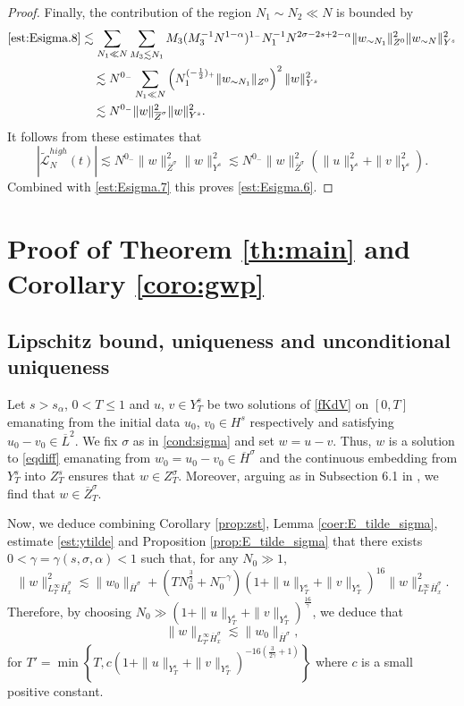 \documentclass{amsart}
\theoremstyle{definition}
\theoremstyle{remark}
\numberwithin{equation}{section}
\begin{document}
\begin{proof}
Finally, the contribution of the region $N_1\sim N_2\ll N$ is bounded by 
\begin{align*}
 \eqref{est:Esigma.8}  & \lesssim  \sum_{N_1\ll N} \sum_{M_3\lesssim N_1} M_3 (M_3^{-1}N^{1-\alpha})^{1_-} N_1^{-1} N^{2\sigma-2s+2-\alpha} \|w_{\sim N_1}\|_{Z^0}^2 \|w_{\sim N}\|_{Y^s}^2 \\
  &\quad \lesssim N^{0_-} \sum_{N_1\ll N} \left(N_1^{(-\frac 12)_+} \|w_{\sim N_1}\|_{Z^0}\right)^2 \|w\|_{Y^s}^2\\
  &\quad \lesssim N^{0_-} \|w\|_{\overline{Z}^\sigma}^2 \|w\|_{Y^s}^2.
\end{align*}
It follows from these estimates that
$$
|\widetilde{\mathcal{L}}_N^{high}(t)| \lesssim N^{0_-} \|w\|_{\overline{Z}^\sigma}^2 \|w\|_{Y^s}^2 \lesssim N^{0_-} \|w\|_{\overline{Z}^\sigma}^2 (\|u\|_{Y^s}^2 + \|v\|_{Y^s}^2).
$$
Combined with \eqref{est:Esigma.7} this proves \eqref{est:Esigma.6}.
\end{proof}



\section{Proof of Theorem \ref{th:main} and Corollary \ref{coro:gwp}} \label{Sec:6}

\subsection{Lipschitz bound, uniqueness and unconditional uniqueness} \label{uniqueness}

Let $s>s_\alpha$, $0<T\le 1$ and $u$, $v \in Y^s_T$ be two solutions of \eqref{fKdV} on $[0,T]$ emanating from the initial data $u_0$, $v_0 \in H^s$ respectively and satisfying $u_0-v_0 \in \overline{L}^2$.  We fix $\sigma$ as in \eqref{cond:sigma} and set $w=u-v$. Thus, $w$ is a solution to \eqref{eqdiff} emanating from $w_0=u_0-v_0 \in \overline{H}^{\sigma}$ and the continuous embedding from $Y^s_T$ into $Z^s_T$ ensures that $w \in Z^\sigma_T$. Moreover, arguing as in Subsection 6.1 in \cite{MPV}, we find that $w\in \overline{Z}^\sigma_T$.

Now, we deduce combining Corollary \ref{prop:zst}, Lemma \ref{coer:E_tilde_sigma}, estimate \eqref{est:ytilde} and Proposition \ref{prop:E_tilde_sigma} that there exists $0<\gamma=\gamma(s,\sigma,\alpha)<1$ such that, for any $N_0 \gg 1$, 
\begin{equation*}
 \|w\|_{L^\infty_T\overline{H}^\sigma_x}^2 \lesssim  \|w_0\|_{\overline{H}^\sigma }+ \left(TN_0^{\frac 32}+N_0^{-\gamma}\right) \left( 1+\|u\|_{Y^s_T}+\|v\|_{Y^s_T}\right)^{16}  \|w\|_{L^\infty_T\overline{H}^\sigma_x}^2  .
\end{equation*}
Therefore, by choosing $N_0\gg  \left( 1+\|u\|_{Y^s_T}+\|v\|_{Y^s_T}\right)^{\frac{16}{\gamma}}$, we deduce that
\begin{equation} \label{Lip}
\|w\|_{L^\infty_{T'}\overline{H}^\sigma_x} \lesssim \|w_0\|_{\overline{H}^\sigma } ,
\end{equation}
for $T'=\min\left\{ T,c\left( 1+\|u\|_{Y^s_T}+\|v\|_{Y^s_T}\right)^{-16(\frac3{2\gamma}+1)}\right\}$
where $c$ is a small positive constant. 
\end{document}
